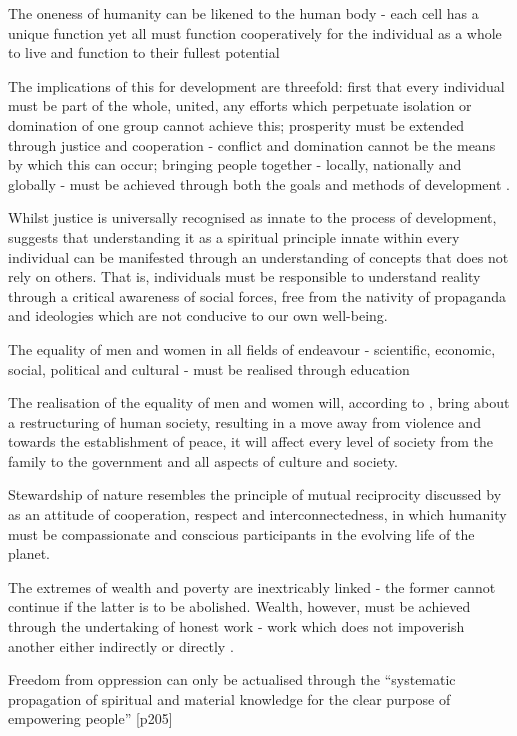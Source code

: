 The oneness of humanity can be likened to the human body - each cell has a unique function yet all must function cooperatively for the individual as a whole to live and function to their fullest potential \citep{Arbab2000}

The implications of this for development are threefold: first that every individual must be part of the whole, united, any efforts which perpetuate isolation or domination of one group cannot achieve this; prosperity must be extended through justice and cooperation - conflict and domination cannot be the means by which this can occur; bringing people together - locally, nationally and globally - must be achieved through both the goals and methods of development \citep{Arbab2000}.

Whilst justice is universally recognised as innate to the process of development, \citet{Arbab2000} suggests that understanding it as a spiritual principle innate within every individual can be manifested through an understanding of concepts that does not rely on others. That is, individuals must be responsible to understand reality through a critical awareness of social forces, free from the nativity of propaganda and ideologies which are not conducive to our own well-being.

The equality of men and women in all fields of endeavour - scientific, economic, social, political and cultural - must be realised through education \citep{Arbab2000}

The realisation of the equality of men and women will, according to \citet{Arbab2000}, bring about a restructuring of human society, resulting in a move away from violence and towards the establishment of peace, it will affect every level of society from the family to the government and all aspects of culture and society.

Stewardship of nature resembles the principle of mutual reciprocity discussed by \citet{Karlberg2004} as an attitude of cooperation, respect and interconnectedness, in which humanity must be compassionate and conscious participants in the evolving life of the planet.

The extremes of wealth and poverty are inextricably linked - the former cannot continue if the latter is to be abolished. Wealth, however, must be achieved through the undertaking of honest work - work which does not impoverish another either indirectly or directly \citep{Arbab2000}.

Freedom from oppression can only be actualised through the “systematic propagation of spiritual and material knowledge for the clear purpose of empowering people” [p205] \citep{Arbab2000}

